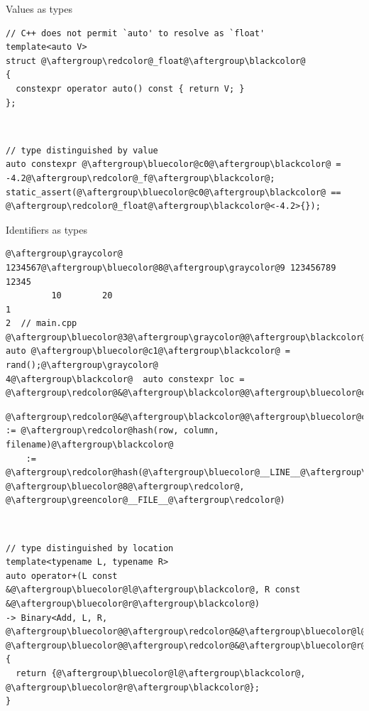 \documentclass[xcolor=dvipsnames]{beamer}
\begin{document}
\begin{frame}[fragile]{Values as types}
\begin{lstlisting}
// C++ does not permit `auto' to resolve as `float'
template<auto V>
struct @\aftergroup\redcolor@_float@\aftergroup\blackcolor@
{
  constexpr operator auto() const { return V; }
};
\end{lstlisting}

~

\begin{lstlisting}
// type distinguished by value
auto constexpr @\aftergroup\bluecolor@c0@\aftergroup\blackcolor@ = -4.2@\aftergroup\redcolor@_f@\aftergroup\blackcolor@;
static_assert(@\aftergroup\bluecolor@c0@\aftergroup\blackcolor@ == @\aftergroup\redcolor@_float@\aftergroup\blackcolor@<-4.2>{});
\end{lstlisting}
\end{frame}



\begin{frame}[fragile]{Identifiers as types}
\begin{lstlisting}
@\aftergroup\graycolor@ 1234567@\aftergroup\bluecolor@8@\aftergroup\graycolor@9 123456789 12345
         10        20
1
2  // main.cpp
@\aftergroup\bluecolor@3@\aftergroup\graycolor@@\aftergroup\blackcolor@  auto @\aftergroup\bluecolor@c1@\aftergroup\blackcolor@ = rand();@\aftergroup\graycolor@
4@\aftergroup\blackcolor@  auto constexpr loc = @\aftergroup\redcolor@&@\aftergroup\blackcolor@@\aftergroup\bluecolor@c1@\aftergroup\blackcolor@@\aftergroup\redcolor@@\aftergroup\blackcolor@;@\aftergroup\graycolor@
\end{lstlisting}


\begin{lstlisting}
@\aftergroup\redcolor@&@\aftergroup\blackcolor@@\aftergroup\bluecolor@c1@\aftergroup\blackcolor@@\aftergroup\redcolor@@\aftergroup\blackcolor@ := @\aftergroup\redcolor@hash(row, column, filename)@\aftergroup\blackcolor@
    := @\aftergroup\redcolor@hash(@\aftergroup\bluecolor@__LINE__@\aftergroup\redcolor@, @\aftergroup\bluecolor@8@\aftergroup\redcolor@, @\aftergroup\greencolor@__FILE__@\aftergroup\redcolor@)
\end{lstlisting}

~

\begin{lstlisting}
// type distinguished by location
template<typename L, typename R>
auto operator+(L const &@\aftergroup\bluecolor@l@\aftergroup\blackcolor@, R const &@\aftergroup\bluecolor@r@\aftergroup\blackcolor@)
-> Binary<Add, L, R, @\aftergroup\bluecolor@@\aftergroup\redcolor@&@\aftergroup\bluecolor@l@\aftergroup\blackcolor@, @\aftergroup\bluecolor@@\aftergroup\redcolor@&@\aftergroup\bluecolor@r@\aftergroup\blackcolor@>
{
  return {@\aftergroup\bluecolor@l@\aftergroup\blackcolor@, @\aftergroup\bluecolor@r@\aftergroup\blackcolor@};
}
\end{lstlisting}
\end{frame}
\end{document}
